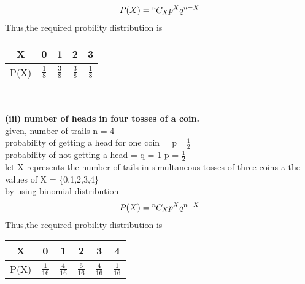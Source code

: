 \documentclass[10pt, a4paper]{article}
\newcommand*{\permcomb}[4][0mu]{{{}^{#3}\mkern#1#2_{#4}}}
\newcommand*{\comb}[1][-1mu]{\permcomb[#1]{C}}
\begin{document}
 \begin{align*}
 P(X) = \comb{n}{X}p^Xq^{n-X}
 \end{align*}
Thus,the required probility distribution is\\
\begin{center}
\begin{tabular}{ |c|c|c|c|c| }
\hline
X & 0 & 1 & 2 & 3\\
\hline
P(X) & $\frac{1}{8}$ & $\frac{3}{8}$ & $\frac{3}{8}$ & $\frac{1}{8}$\\
\hline
\end{tabular}\\
\end{center}
\textbf{(iii) number of heads in four tosses of a coin.}\\
given, number of trails n = 4\\
probability of getting a head for one coin = p =$\frac{1}{2}$\\
probability of not getting a head = q = 1-p = $\frac{1}{2}$\\
let X represents the number of tails in simultaneous tosses of three coins
 $\therefore$ the values of X = \{0,1,2,3,4\}\\
 by using binomial distribution\\
 \begin{align*}
 P(X) = \comb{n}{X}p^Xq^{n-X}
 \end{align*}
Thus,the required probility distribution is\\
\begin{center}
\begin{tabular}{ |c|c|c|c|c|c| }
\hline
X & 0 & 1 & 2 & 3 & 4\\
\hline
P(X) & $\frac{1}{16}$ & $\frac{4}{16}$ & $\frac{6}{16}$ & $\frac{4}{16}$ & $\frac{1}{16}$\\
\hline
\end{tabular}\\
\end{center}
\end{document}
